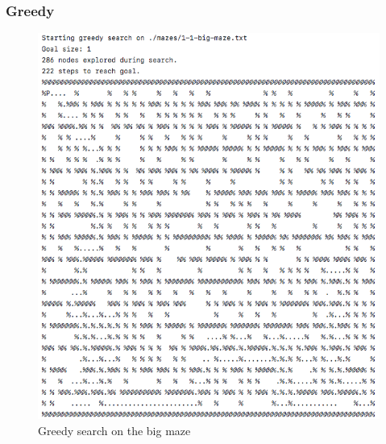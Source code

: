 \documentclass[titlepage]{article}
\begin{document}
\subsubsection*{Greedy}
\begin{figure}[h!]
\includegraphics[width=\linewidth]{greedybig.png}
\caption{Greedy search on the big maze}
\label{fig:greedybig}
\end{figure}

\newpage
\end{document}
